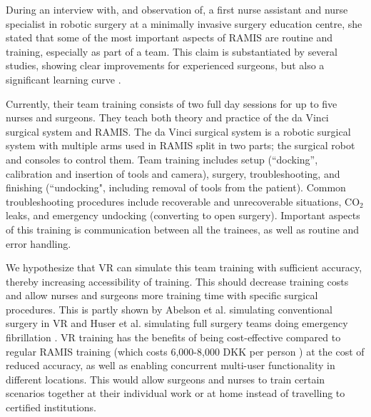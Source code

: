 \documentclass[conference]{IEEEtran}
\begin{document}
During an interview with, and observation of, a first nurse assistant and nurse specialist in robotic surgery at a minimally invasive surgery education centre, she stated that some of the most important aspects of RAMIS are routine and training, especially as part of a team. This claim is substantiated by several studies, showing clear improvements for experienced surgeons, but also a significant learning curve \citep{moorthy_human_2005,chandra_comparison_2010}.%

Currently, their team training consists of two full day sessions for up to five nurses and surgeons. They teach both theory and practice of the da Vinci surgical system and RAMIS. The da Vinci surgical system is a robotic surgical system with multiple arms used in RAMIS split in two parts; the surgical robot and consoles to control them. Team training includes setup (``docking'', calibration and insertion of tools and camera), surgery, troubleshooting, and finishing (``undocking", including removal of tools from the patient). Common troubleshooting procedures include recoverable and unrecoverable situations, CO$_2$ leaks, and emergency undocking (converting to open surgery). Important aspects of this training is communication between all the trainees, as well as routine and error handling.%

We hypothesize that VR can simulate this team training with sufficient accuracy, thereby increasing accessibility of training. This should decrease training costs and allow nurses and surgeons more training time with specific surgical procedures. This is partly shown by Abelson et al. simulating conventional surgery in VR and Huser et al. simulating full surgery teams doing emergency fibrillation \citep{abelson_virtual_2015,huser_simulated_2014}. VR training has the benefits of being cost-effective compared to regular RAMIS training (which costs 6,000-8,000 DKK per person \citep{miuc_miuc_nodate}) at the cost of reduced accuracy, as well as enabling concurrent multi-user functionality in different locations. This would allow surgeons and nurses to train certain scenarios together at their individual work or at home instead of travelling to certified institutions. 
\end{document}
